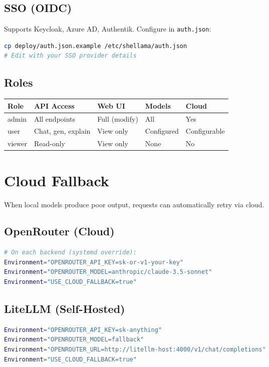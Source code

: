 \documentclass[11pt,a4paper]{article}
\begin{document}
\subsection{SSO (OIDC)}
Supports Keycloak, Azure AD, Authentik. Configure in \texttt{auth.json}:
\begin{lstlisting}[language=bash]
cp deploy/auth.json.example /etc/shellama/auth.json
# Edit with your SSO provider details
\end{lstlisting}

\subsection{Roles}
\begin{longtable}{p{2cm}p{3cm}p{3cm}p{3cm}p{2.5cm}}
\toprule
\textbf{Role} & \textbf{API Access} & \textbf{Web UI} & \textbf{Models} & \textbf{Cloud} \\
\midrule
admin & All endpoints & Full (modify) & All & Yes \\
user & Chat, gen, explain & View only & Configured & Configurable \\
viewer & Read-only & View only & None & No \\
\bottomrule
\end{longtable}

\section{Cloud Fallback}

When local models produce poor output, requests can automatically retry via cloud.

\subsection{OpenRouter (Cloud)}
\begin{lstlisting}[language=bash]
# On each backend (systemd override):
Environment="OPENROUTER_API_KEY=sk-or-v1-your-key"
Environment="OPENROUTER_MODEL=anthropic/claude-3.5-sonnet"
Environment="USE_CLOUD_FALLBACK=true"
\end{lstlisting}

\subsection{LiteLLM (Self-Hosted)}
\begin{lstlisting}[language=bash]
Environment="OPENROUTER_API_KEY=sk-anything"
Environment="OPENROUTER_MODEL=fallback"
Environment="OPENROUTER_URL=http://litellm-host:4000/v1/chat/completions"
Environment="USE_CLOUD_FALLBACK=true"
\end{lstlisting}
\end{document}
